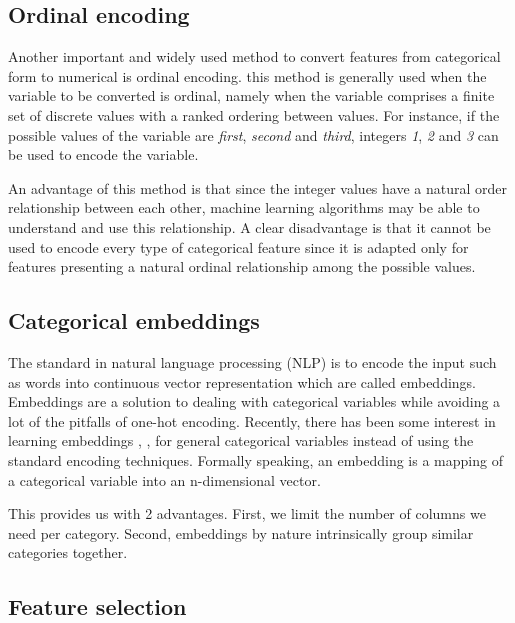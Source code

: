 \documentclass[LaM,binding=0.6cm, english]{sapthesis}
\begin{document}
\subsection{Ordinal encoding} \label{ordinal_encoding}

Another important and widely used method to convert features from categorical form to numerical is ordinal encoding. this method is generally used when the variable to be converted is ordinal, namely when the variable comprises a finite set of discrete values with a ranked ordering between values. For instance, if the possible values of the variable are \textit{first}, \textit{second} and \textit{third}, integers \textit{1}, \textit{2} and \textit{3} can be used to encode the variable. 

\par An advantage of this method is that since the integer values have a natural order relationship between each other, machine learning algorithms may be able to understand and use this relationship. A clear disadvantage is that it cannot be used to encode every type of categorical feature since it is adapted only for features presenting a natural ordinal relationship among the possible values.

\subsection{Categorical embeddings} \label{categorical_embeddings}

The standard in natural language processing (NLP) is to encode the input such as words into continuous vector representation which are called embeddings.\cite{Almeida2019} Embeddings are a solution to dealing with categorical variables while avoiding a lot of the pitfalls of one-hot encoding. Recently, there has
been some interest in learning embeddings \cite{Hannes}, \cite{Berkhahn2016}, \cite{Russac2018} for general
categorical variables instead of using the standard encoding
techniques. Formally speaking, an embedding is a mapping of a categorical variable into an n-dimensional vector.

This provides us with 2 advantages. First, we limit the number of columns we need per category. Second, embeddings by nature intrinsically group similar categories together.

\subsection{Feature selection} \label{feature_selection}
\end{document}
